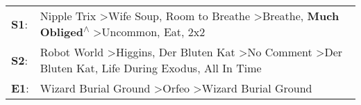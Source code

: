 \begin{supertabular}{p{0.03\textwidth}p{0.92\textwidth}}
 \textbf{S1}:  &  Nipple Trix\textsuperscript{} \textgreater \enspace Wife Soup\textsuperscript{}, \enspace Room to Breathe\textsuperscript{} \textgreater \enspace Breathe\textsuperscript{}, \enspace \textbf{Much Obliged\textsuperscript{$\wedge$}} \textgreater \enspace Uncommon\textsuperscript{}, \enspace Eat\textsuperscript{}, \enspace 2x2\textsuperscript{}  \enspace  \\
 \textbf{S2}:  &                               Robot World\textsuperscript{} \textgreater \enspace Higgins\textsuperscript{}, \enspace Der Bluten Kat\textsuperscript{} \textgreater \enspace No Comment\textsuperscript{} \textgreater \enspace Der Bluten Kat\textsuperscript{}, \enspace Life During Exodus\textsuperscript{}, \enspace All In Time\textsuperscript{}  \enspace  \\
 \textbf{E1}:  &                                                                                                                                                                                                       Wizard Burial Ground\textsuperscript{} \textgreater \enspace Orfeo\textsuperscript{} \textgreater \enspace Wizard Burial Ground\textsuperscript{}  \enspace  \\
\end{supertabular}
